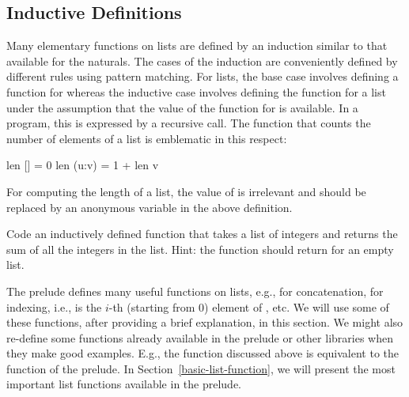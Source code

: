\subsection{Inductive Definitions}

Many elementary functions on lists are defined by an induction similar
to that available for the naturals.
The cases of the induction are conveniently defined by
different rules using pattern matching.
For lists, the base case involves defining a function for \code{[]}
whereas the inductive case involves defining the function for
a list  under the assumption that the value of the
function for  is available.
In a program, this is expressed by a recursive call.
The function that counts the number of elements of a list
is emblematic in this respect:
%
\begin{curry}
len []    = 0
len (u:v) = 1 + len v
\end{curry}
%
For computing the length of a list, the value of  is irrelevant and
 should be replaced by an anonymous variable in the above
definition.
%
\begin{exercise}
Code an inductively defined function that takes a list of integers and
returns the sum of all the integers in the list.
Hint: the function should return  for an empty list.
\end{exercise}
%
The prelude defines many useful functions on lists,
e.g., \ccode{++} for concatenation, \ccode{!!} for indexing,
i.e.,  is the $i$-th (starting from 0) element of ,
etc.  We will use some of these functions, after providing a brief
explanation, in this section.  We might also re-define some functions
already available in the prelude or other libraries
when they make good examples.  E.g., the function 
discussed above is equivalent to the function 
of the prelude.
In Section~\ref{basic-list-function}, we will present the
most important list functions available in the prelude.

